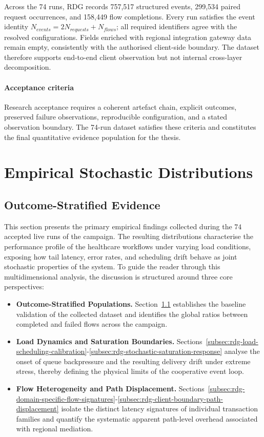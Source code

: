 \noindent Across the 74 runs, RDG records 757{,}517 structured events,
299{,}534 paired request occurrences, and 158{,}449 flow completions. Every run
satisfies the event identity
$N_{events}=2N_{requests}+N_{flows}$; all required identifiers agree with the resolved configurations. Fields enriched with regional integration gateway data
remain empty, consistently with the authorised client-side boundary. The
dataset therefore supports end-to-end client observation but not internal
cross-layer decomposition.

\paragraph{Acceptance criteria}
\noindent Research acceptance requires a coherent
artefact chain, explicit outcomes, preserved failure observations, reproducible
configuration, and a stated observation boundary. The 74-run dataset satisfies
these criteria and constitutes the final quantitative evidence population for
the thesis.

\section{Empirical Stochastic Distributions}
\label{sec:rdg-results-discussion}

\subsection{Outcome-Stratified Evidence}
\label{subsec:rdg-functional-quantitative-evidence}
\noindent This section presents the primary empirical findings collected during the
$74$ accepted live runs of the campaign. The resulting distributions
characterise the performance profile of the healthcare workflows under varying
load conditions, exposing how tail latency, error rates, and scheduling drift
behave as joint stochastic properties of the system. To guide the reader
through this multidimensional analysis, the discussion is structured around
three core perspectives:
\begin{itemize}
    \setlength{\emergencystretch}{2em}
    \item \textbf{Outcome-Stratified Populations.}
    Section~\ref{subsec:rdg-functional-quantitative-evidence} establishes the
    baseline validation of the collected dataset and identifies the global
    ratios between completed and failed flows across the campaign.
    \item \textbf{Load Dynamics and Saturation Boundaries.}
    Sections~\ref{subsec:rdg-load-scheduling-calibration}-\ref{subsec:rdg-stochastic-saturation-response} analyse the onset of queue
    backpressure and the resulting delivery drift under extreme stress, thereby
    defining the physical limits of the cooperative event loop.
    \item \textbf{Flow Heterogeneity and Path Displacement.}
    Sections~\ref{subsec:rdg-domain-specific-flow-signatures}-\ref{subsec:rdg-client-boundary-path-displacement} isolate the distinct
    latency signatures of individual transaction families and quantify the
    systematic apparent path-level overhead associated with regional mediation.
\end{itemize}

